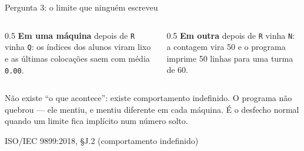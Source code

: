 \documentclass[aspectratio=169]{beamer}
\newcommand{\fonte}[1]{\vfill\hfill{\scriptsize\textcolor{UFSGray}{#1}}}
\begin{document}
\begin{frame}[fragile]{Pergunta 3: o limite que ninguém escreveu}
  \begin{center}
  \end{center}
  \begin{columns}[T]
    \begin{column}{0.5\textwidth}
      \small \textcolor{UFSRed}{\textbf{Em uma máquina}} depois de
      \texttt{R} vinha \texttt{Q}: os índices dos alunos viram lixo e as
      últimas colocações saem com média \texttt{0.00}.
    \end{column}
    \begin{column}{0.5\textwidth}
      \small \textcolor{UFSRed}{\textbf{Em outra}} depois de \texttt{R}
      vinha \texttt{N}: a contagem vira 50 e o programa imprime 50 linhas
      para uma turma de 60.
    \end{column}
  \end{columns}
  \begin{block}{}
    \small Não existe ``o que acontece'': existe comportamento indefinido.
    O programa não quebrou --- ele mentiu, e mentiu diferente em cada
    máquina. É o desfecho normal quando um limite fica implícito num número
    solto.
  \end{block}
  \fonte{ISO/IEC 9899:2018, §J.2 (comportamento indefinido)~\cite{iso2018c17}}
\end{frame}
\end{document}
